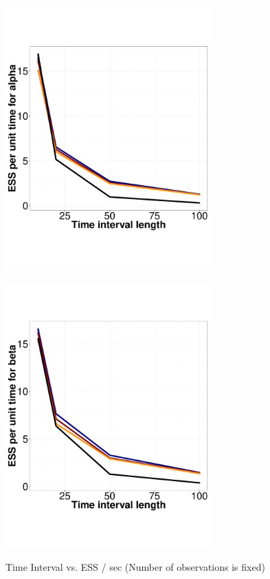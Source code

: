   \begin{figure}%
  \centering
  \begin{minipage}[hp]{0.45\linewidth}
  \centering
    \includegraphics [width=0.70\textwidth, angle=0]{figs/ESS_vs_t_alpha_fixobservation.pdf}
    \end{minipage}
  \begin{minipage}[hp]{0.45\linewidth}
  \centering
    \includegraphics [width=0.70\textwidth, angle=0]{figs/ESS_vs_t_beta_fixobservation.pdf}
    \vspace{-0 in}
     \label{fig:TSS2}
  \end{minipage}
    \caption{Time Interval vs. ESS / sec (Number of observations is fixed)}
  \end{figure}
